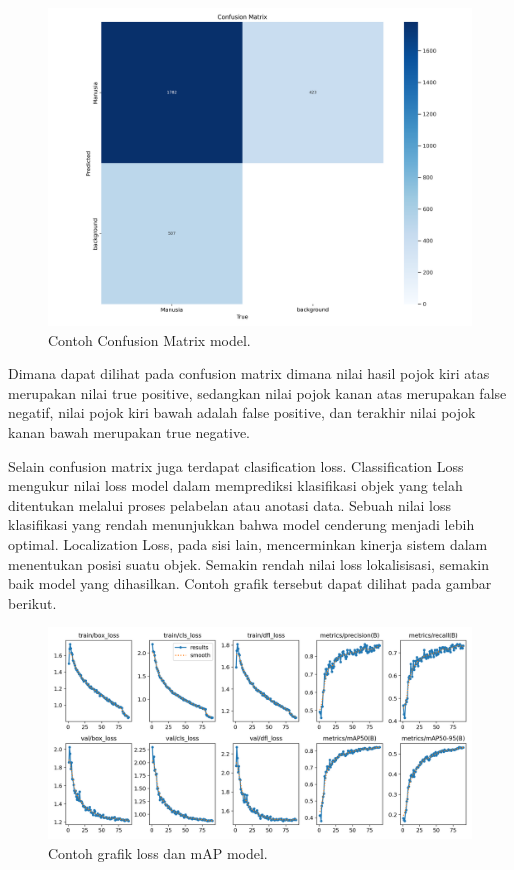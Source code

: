 \begin{figure}[H]
  \centering
  \includegraphics[scale=0.25]{gambar/download.png}
  \caption{Contoh Confusion Matrix model.}
  \label{fig:confusion matrix model}
\end{figure}

Dimana dapat dilihat pada confusion matrix dimana nilai hasil pojok kiri atas merupakan nilai true positive, sedangkan nilai pojok kanan atas merupakan false negatif, nilai pojok kiri bawah adalah false positive, dan terakhir nilai pojok kanan bawah merupakan true negative.

Selain confusion matrix juga terdapat clasification loss. Classification Loss mengukur nilai loss model dalam memprediksi klasifikasi objek yang telah ditentukan melalui proses pelabelan atau anotasi data. Sebuah nilai loss klasifikasi yang rendah menunjukkan bahwa model cenderung menjadi lebih optimal. Localization Loss, pada sisi lain, mencerminkan kinerja sistem dalam menentukan posisi suatu objek. Semakin rendah nilai loss lokalisisasi, semakin baik model yang dihasilkan. Contoh grafik tersebut dapat dilihat pada gambar berikut.

\begin{figure}[H]
  \centering
  \includegraphics[scale=0.35]{gambar/map dan loss contoh.png}
  \caption{Contoh grafik loss dan mAP model.}
  \label{fig:confusion matrix model}
\end{figure}

